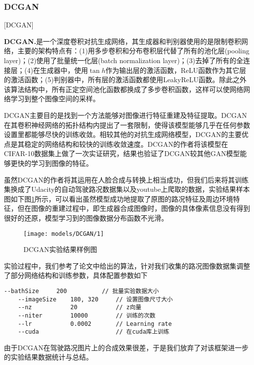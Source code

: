 \subsubsection{DCGAN}[DCGAN]

\textbf{DCGAN.}\cite{dcgan}\quad 是一个深度卷积对抗生成网络，其生成器和判别器使用的是限制卷积网络，主要的架构特点有：(1)用多步卷积和分布卷积层代替了所有的池化层(pooling layer)；(2)使用了批量统一化层(batch normalization layer)；(3)去掉了所有的全连接层；(4)在生成器中，使用$\tan{h}$作为输出层的激活函数，ReLU函数作为其它层的激活函数；(5)判别器中，所有层的激活函数都使用LeakyReLU函数。除此之外该算法结构中，所有正定空间池化函数都换成了多步卷积函数，这样可以使网络网络学习到整个图像空间的采样。

DCGAN主要目的是找到一个方法能够对图像进行特征重建及特征提取。DCGAN在其卷积神经网络的拓扑结构内提出了一套限制，使得该模型能够几乎在任何参数设置里都能够尽快的训练收敛。相较其他的对抗生成网络模型，DCGAN的主要优点是其稳定的网络结构和较快的训练收敛速度。DCGAN的作者将该模型在CIFAR-10\cite{cifar10}数据集上做了一次实证研究，结果也验证了DCGAN较其他GAN模型能够更快的学习到图像的特征。

虽然DCGAN的作者将其运用在人脸合成与转换上相当成功，但我们后来将其训练集换成了Udacity的自动驾驶路况数据集以及youtube上爬取的数据，实验结果样本图如下图\ref{dcgan_example}所示，可以看出虽然模型成功地提取了原图的路况特征及周边环境特征，但在图像的重建过程中，即生成器合成图像时，图像的具体像素信息没有得到很好的还原，模型学习到的图像数据分布函数不光滑。

\begin{figure}[h]
    \centering
    \texttt{[image: models/DCGAN/1]}
    \caption{DCGAN实验结果样例图}
    \label{dcgan_example}
\end{figure}

实验过程中，我们参考了\cite{dcgan}论文中给出的算法，针对我们收集的路况图像数据集调整了部分网络结构和训练参数，具体配置参数如下

\begin{lstlisting}[basicstyle=\small]
    --bathSize     200          // 批量实验数据大小
    --imageSize    180, 320     // 设置图像尺寸大小
    --nz           20           // z向量
    --niter        10000        // 训练的次数
    --lr           0.0002       // Learning rate
    --cuda                      // 在cuda库上训练
\end{lstlisting}

由于DCGAN在驾驶路况图片上的合成效果很差，于是我们放弃了对该框架进一步的实验结果数据统计与总结。

